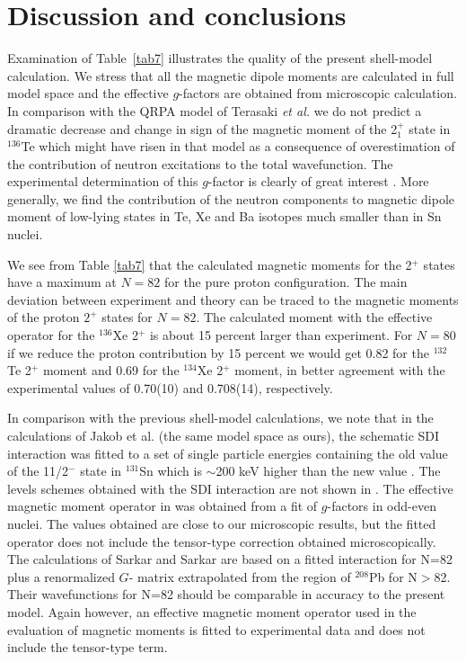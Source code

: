 \documentclass[aps,twocolumn,superscriptaddress,prc,showpacs]{revtex4}
\begin{document}
\endgroup

\section{Discussion and conclusions}

Examination of Table~\ref{tab7} illustrates the quality of the present shell-model calculation.
We stress that all the magnetic dipole moments are calculated in full
model space and the effective $g$-factors are obtained from microscopic calculation.
In comparison with the QRPA model of Terasaki {\em et al.} \cite{ter02} we do not predict a
dramatic decrease and change in sign of the magnetic moment of the 2$^+_1$ state in $^{136}$Te
which might have risen in that model as a consequence of overestimation of the contribution
of neutron excitations to the total wavefunction. The experimental determination
of this $g$-factor is clearly of great interest \cite{isoldete136}. 
More generally, we find the
contribution of the neutron components to magnetic dipole moment of low-lying
states in Te, Xe and Ba isotopes much smaller than in Sn nuclei.

We see from Table \ref{tab7} that the calculated magnetic moments for the 2$^+$ states
have a maximum at $N=82$ for the pure proton configuration.
The main deviation between experiment and theory can be traced to the magnetic
moments of the proton $2^+$ states for $N=82$. The calculated moment with the effective operator for
the $^{136}$Xe 2$^{ + }$ is about 15 percent larger than experiment. For $N=80$ 
if we reduce the
proton contribution by 15 percent we would get 0.82 for the $^{132}$Te 2$^{ + }$ moment
and 0.69 for the $^{134}$Xe 2$^{ + }$ moment, in better
agreement with the experimental values of 0.70(10) and 0.708(14), respectively. 

In comparison with the previous shell-model calculations,
we note that in the calculations of Jakob et al. \cite{jak02} (the same model space as ours),
the schematic SDI interaction was fitted to a set of single particle energies
containing the old value of the 11/2$^-$ state in $^{131}$Sn which is $\sim$200 keV
higher than the new value \cite{fogel}. The levels schemes obtained with the SDI interaction
are not shown in \cite{jak02}. The effective magnetic moment operator in \cite{jak02}
was obtained from a fit of $g$-factors in odd-even nuclei.
The values obtained are close to our microscopic results, but the fitted operator does
not include the tensor-type correction obtained microscopically. The calculations
of Sarkar and Sarkar \cite{sar01} are 
based on a fitted interaction for N=82 plus a
renormalized $ G $- matrix extrapolated from the region of $^{208}$Pb for N$>$82. Their wavefunctions
for N=82 
should be comparable in accuracy to the present model. Again however, 
an effective magnetic moment
operator used in the 
evaluation of magnetic moments is fitted to
experimental data and does not include the tensor-type term.
\end{document}

